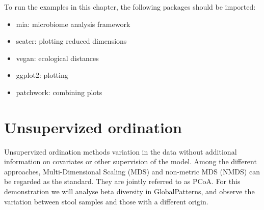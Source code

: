 \documentclass[
]{book}
\newenvironment{Shaded}{\begin{snugshade}}{\end{snugshade}}
\newcommand{\AttributeTok}[1]{\textcolor[rgb]{0.77,0.63,0.00}{#1}}
\newcommand{\CommentTok}[1]{\textcolor[rgb]{0.56,0.35,0.01}{\textit{#1}}}
\newcommand{\FunctionTok}[1]{\textcolor[rgb]{0.00,0.00,0.00}{#1}}
\newcommand{\NormalTok}[1]{#1}
\newcommand{\OtherTok}[1]{\textcolor[rgb]{0.56,0.35,0.01}{#1}}
\newcommand{\SpecialCharTok}[1]{\textcolor[rgb]{0.00,0.00,0.00}{#1}}
\newcommand{\StringTok}[1]{\textcolor[rgb]{0.31,0.60,0.02}{#1}}
\providecommand{\tightlist}{%
  \setlength{\itemsep}{0pt}\setlength{\parskip}{0pt}}
\begin{document}
To run the examples in this chapter, the following packages should be imported:

\begin{itemize}
\tightlist
\item
  mia: microbiome analysis framework
\item
  scater: plotting reduced dimensions
\item
  vegan: ecological distances
\item
  ggplot2: plotting
\item
  patchwork: combining plots
\end{itemize}

\hypertarget{unsupervized-ordination}{%
\section{Unsupervized ordination}\label{unsupervized-ordination}}

Unsupervized ordination methods variation in the data without additional
information on covariates or other supervision of the model. Among the different
approaches, Multi-Dimensional Scaling (MDS) and non-metric MDS (NMDS) can be
regarded as the standard. They are jointly referred to as PCoA. For this
demonstration we will analyse beta diversity in GlobalPatterns, and observe the
variation between stool samples and those with a different origin.

\begin{Shaded}
\end{Shaded}
\end{document}
